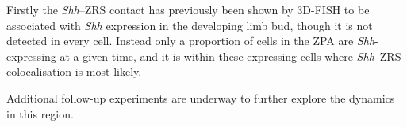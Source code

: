 \documentclass[a4paper,11pt,oneside]{book}
\begin{document}
Firstly the \emph{Shh}--ZRS contact has previously been shown by 3D-FISH to be associated with \emph{Shh} expression in the developing limb bud, though it is not detected in every cell.\cite{Amano2009, Hill2013a} Instead only a proportion of cells in the ZPA are \emph{Shh}-expressing at a given time, and it is within these expressing cells where \emph{Shh}--ZRS colocalisation is most likely.\cite{Amano2009}


Additional follow-up experiments are underway to further explore the dynamics in this region.




\ifstandalone
\begin{small}

\end{small}
\fi
\end{document}
